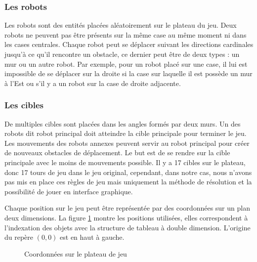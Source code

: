 \documentclass[a4paper]{article} %
\begin{document}
			\subsubsection{Les robots}
Les robots sont des entités placées aléatoirement sur le plateau du jeu. Deux robots ne peuvent pas être présents sur la même case au même moment ni dans les cases centrales. Chaque robot peut se déplacer suivant les directions cardinales jusqu'à ce qu'il rencontre un obstacle, ce dernier peut être de deux types : un mur ou un autre robot. Par exemple, pour un robot placé sur une case, il lui est impossible de se déplacer sur la droite si la case sur laquelle il est possède un mur à l'Est ou s'il y a un robot sur la case de droite adjacente. 

			\subsubsection{Les cibles}
De multiples cibles sont placées dans les angles formés par deux murs. Un des robots dit robot principal doit atteindre la cible principale pour terminer le jeu. Les mouvements des robots annexes peuvent servir au robot principal pour créer de nouveaux obstacles de déplacement. Le but est de se rendre sur la cible principale avec le moins de mouvements possible.
Il y a 17 cibles sur le plateau, donc 17 tours de jeu dans le jeu original, cependant, dans notre cas, nous n'avons pas mis en place ces règles de jeu mais uniquement la méthode de résolution et la possibilité de jouer en interface graphique.

Chaque position sur le jeu peut être représentée par des coordonnées sur un plan deux dimensions. La figure \ref{coordonnesFig} montre les positions utilisées, elles correspondent à l'indexation des objets avec la structure de tableau à double dimension. L'origine du repère $(0,0)$ est en haut à gauche.
\pagebreak

\begin{figure}[htpb]
\centering
  \caption{Coordonnées sur le plateau de jeu}\label{coordonnesFig}
\end{figure}
\end{document}
